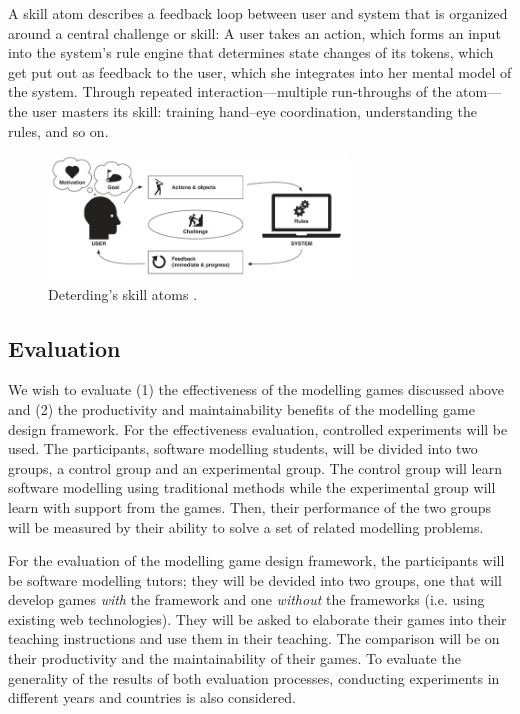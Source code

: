 \documentclass[12pt, a4paper]{report}
\begin{document}
A skill atom describes a feedback loop between user and system that is organized around a central challenge or skill: A user takes an action, which forms an input into the system’s rule engine that determines state changes of its tokens, which get put out as feedback to the user, which she integrates into her mental model of the system. Through repeated interaction—multiple run-throughs of the atom—the user masters its skill: training hand–eye coordination, understanding the rules, and so on.

\begin{figure}[ht]
\centering
\includegraphics[width=8cm]{skill-atoms}
\caption{Deterding's skill atoms \cite{deterding2015lens}.}
\label{fig:skill-atoms}
\end{figure}

\subsection{Evaluation}
We wish to evaluate (1) the effectiveness of the modelling games discussed above and (2) the productivity and maintainability benefits of the modelling game design framework. For the effectiveness evaluation, controlled experiments will be used. The participants, software modelling students, will be divided into two groups, a control group and an experimental group. The control group will learn software modelling using traditional methods while the experimental group will learn with support from the games. Then, their performance of the two groups will be measured by their ability to solve a set of related modelling problems. 

For the evaluation of the modelling game design framework, the participants will be software modelling tutors; they will be devided into two groups, one that will develop games \emph{with} the framework and one \emph{without} the frameworks (i.e. using existing web technologies). They will be asked to elaborate their games into their teaching instructions and use them in their teaching. The comparison will be on their productivity and the maintainability of their games. To evaluate the generality of the results of both evaluation processes, conducting experiments in different years and countries is also considered.
\end{document}

